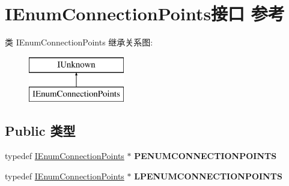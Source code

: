 \hypertarget{interface_i_enum_connection_points}{}\section{I\+Enum\+Connection\+Points接口 参考}
\label{interface_i_enum_connection_points}
类 I\+Enum\+Connection\+Points 继承关系图\+:\begin{figure}[H]
\begin{center}
\leavevmode
\includegraphics[height=2.000000cm]{interface_i_enum_connection_points}
\end{center}
\end{figure}
\subsection*{Public 类型}
\begin{DoxyCompactItemize}
\item 
\mbox{\label{interface_i_enum_connection_points_a2244adbd24c74af7ba0ca04ae3ee19fa}} 
typedef \hyperlink{interface_i_enum_connection_points}{I\+Enum\+Connection\+Points} $\ast$ {\bfseries P\+E\+N\+U\+M\+C\+O\+N\+N\+E\+C\+T\+I\+O\+N\+P\+O\+I\+N\+TS}
\item 
\mbox{\label{interface_i_enum_connection_points_ac2b5e45ac29fbb99a99b1bca5386aa8e}} 
typedef \hyperlink{interface_i_enum_connection_points}{I\+Enum\+Connection\+Points} $\ast$ {\bfseries L\+P\+E\+N\+U\+M\+C\+O\+N\+N\+E\+C\+T\+I\+O\+N\+P\+O\+I\+N\+TS}
\end{DoxyCompactItemize}
